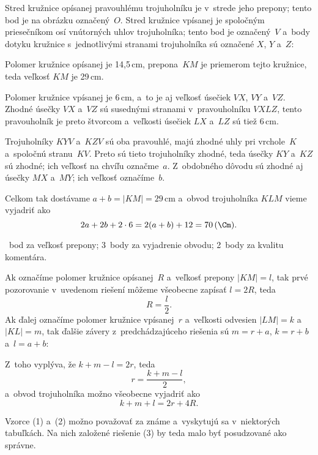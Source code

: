 {%
Stred kružnice opísanej pravouhlému trojuholníku je v~strede jeho prepony; tento bod je na obrázku označený~$O$.
Stred kružnice vpísanej je spoločným priesečníkom osí vnútorných uhlov trojuholníka; tento bod je označený~$V$ a~body dotyku kružnice s~jednotlivými stranami trojuholníka sú označené $X$, $Y$ a~$Z$:
%

Polomer kružnice opísanej je 14,5\,cm, prepona~$KM$ je priemerom tejto kružnice, teda veľkosť $KM$ je 29\,cm.

Polomer kružnice vpísanej je 6\,cm, a~to je aj veľkosť úsečiek $VX$, $VY$ a~$VZ$.
Zhodné úsečky $VX$ a~$VZ$ sú susednými stranami v~pravouholníku $VXLZ$, tento pravouholník je preto štvorcom a~veľkosti úsečiek $LX$ a~$LZ$ sú tiež 6\,cm.

Trojuholníky $KYV$ a~$KZV$ sú oba pravouhlé, majú zhodné uhly pri vrchole~$K$ a~spoločnú stranu~$KV$.
Preto sú tieto trojuholníky zhodné, teda úsečky $KY$ a~$KZ$ sú zhodné; ich veľkosť na chvíľu označme~$a$.
Z~obdobného dôvodu sú zhodné aj úsečky $MX$ a~$MY$; ich veľkosť označíme~$b$.

Celkom tak dostávame $a+b=|KM|=29$\,cm a~obvod trojuholníka $KLM$ vieme vyjadriť ako
$$
2a+2b+2\cdot 6=2(a+b)+12=70\,(\Cm).
$$

~bod za veľkosť prepony;
3~body za vyjadrenie obvodu;
2~body za kvalitu komentára.
\endhodnotenie

\poznamka
Ak označíme polomer kružnice opísanej~$R$ a~veľkosť prepony $|KM|=l$, tak prvé pozorovanie v~uvedenom riešení môžeme všeobecne zapísať $l=2R$, teda
$$R=\frac{l}{2}. \tag{1}$$
Ak ďalej označíme polomer kružnice vpísanej~$r$ a~veľkosti odvesien $|LM|=k$ a~$|KL|=m$, tak ďalšie závery z~predchádzajúceho riešenia sú $m=r+a$, $k=r+b$ a~$l=a+b$:
%

Z~toho vyplýva, že $k+m-l=2r$, teda
$$r=\frac{k+m-l}2, \tag{2}$$
a~obvod trojuholníka možno všeobecne vyjadriť ako
$$
k+m+l=2r+4R. \tag{3}
$$

Vzorce (1) a~(2) možno považovať za známe a~vyskytujú sa v~niektorých tabuľkách.
Na nich založené riešenie (3) by teda malo byť posudzované ako správne.
}

